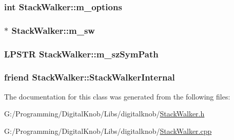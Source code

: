 \hypertarget{class_stack_walker_a3534033da2986b16d5f15f0b4feefa54}{
\subsubsection[{m\-\_\-options}]{\setlength{\rightskip}{0pt plus 5cm}int Stack\-Walker\-::m\-\_\-options\hspace{0.3cm}{\ttfamily [protected]}}}\label{class_stack_walker_a3534033da2986b16d5f15f0b4feefa54}
\hypertarget{class_stack_walker_a13524e6f4cd89a8b3a3fd378e3cd3f55}{
\subsubsection[{m\-\_\-sw}]{$\ast$ Stack\-Walker\-::m\-\_\-sw\hspace{0.3cm}{\ttfamily [protected]}}}\label{class_stack_walker_a13524e6f4cd89a8b3a3fd378e3cd3f55}
\hypertarget{class_stack_walker_aff1b39f2ea31f24b4a693928cdf5549d}{
\subsubsection[{m\-\_\-sz\-Sym\-Path}]{\setlength{\rightskip}{0pt plus 5cm}L\-P\-S\-T\-R Stack\-Walker\-::m\-\_\-sz\-Sym\-Path\hspace{0.3cm}{\ttfamily [protected]}}}\label{class_stack_walker_aff1b39f2ea31f24b4a693928cdf5549d}
\hypertarget{class_stack_walker_ab0d4fa92227f651635d04da2947b873a}{
\subsubsection[{Stack\-Walker\-Internal}]{\setlength{\rightskip}{0pt plus 5cm}friend Stack\-Walker\-::\-Stack\-Walker\-Internal\hspace{0.3cm}{\ttfamily [protected]}}}\label{class_stack_walker_ab0d4fa92227f651635d04da2947b873a}


The documentation for this class was generated from the following files\-:\begin{DoxyCompactItemize}
\item 
G\-:/\-Programming/\-Digital\-Knob/\-Libs/digitalknob/\hyperlink{_stack_walker_8h}{Stack\-Walker.\-h}\item 
G\-:/\-Programming/\-Digital\-Knob/\-Libs/digitalknob/\hyperlink{_stack_walker_8cpp}{Stack\-Walker.\-cpp}\end{DoxyCompactItemize}

